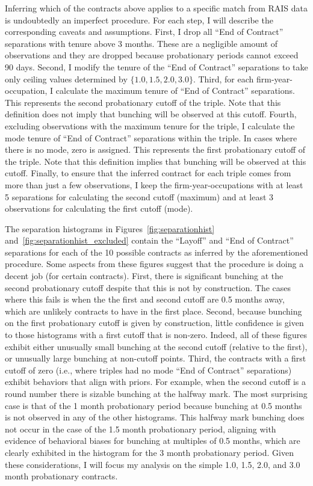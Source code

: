 \documentclass[12pt]{article}
\begin{document}
Inferring which of the contracts above applies to a specific match from RAIS data is undoubtedly an imperfect procedure.
For each step, I will describe the corresponding caveats and assumptions.
First, I drop all ``End of Contract'' separations with tenure above 3 months.
These are a negligible amount of observations and they are dropped because probationary periods cannot exceed 90 days.
Second, I modify the tenure of the ``End of Contract'' separations to take only ceiling values determined by $\{1.0,1.5,2.0,3.0\}$.
Third, for each firm-year-occupation, I calculate the maximum tenure of ``End of Contract'' separations.
This represents the second probationary cutoff of the triple.
Note that this definition does not imply that bunching will be observed at this cutoff.
Fourth, excluding observations with the maximum tenure for the triple, I calculate the mode tenure of ``End of Contract'' separations within the triple. 
In cases where there is no mode, zero is assigned.
This represents the first probationary cutoff of the triple.
Note that this definition implies that bunching will be observed at this cutoff.
Finally, to ensure that the inferred contract for each triple comes from more than just a few observations, I keep the firm-year-occupations with at least 5 separations for calculating the second cutoff (maximum) and at least 3 observations for calculating the first cutoff (mode).

The separation histograms in Figures~\ref{fig:separationhist} and~\ref{fig:separationhist_excluded} contain the ``Layoff'' and ``End of Contract'' separations for each of the 10 possible contracts as inferred by the aforementioned procedure.
Some aspects from these figures suggest that the procedure is doing a decent job (for certain contracts).
First, there is significant bunching at the second probationary cutoff despite that this is not by construction.
The cases where this fails is when the the first and second cutoff are 0.5 months away, which are unlikely contracts to have in the first place.
Second, because bunching on the first probationary cutoff is given by construction, little confidence is given to those histograms with a first cutoff that is non-zero.
Indeed, all of these figures exhibit either unusually small bunching at the second cutoff (relative to the first), or unusually large bunching at non-cutoff points.
Third, the contracts with a first cutoff of zero (i.e., where triples had no mode ``End of Contract'' separations) exhibit behaviors that align with priors.
For example, when the second cutoff is a round number there is sizable bunching at the halfway mark.
The most surprising case is that of the 1 month probationary period because bunching at 0.5 months is not observed in any of the other histograms.
This halfway mark bunching does not occur in the case of the 1.5 month probationary period, aligning with evidence of behavioral biases for bunching at multiples of 0.5 months, which are clearly exhibited in the histogram for the 3 month probationary period.
Given these considerations, I will focus my analysis on the simple 1.0, 1.5, 2.0, and 3.0 month probationary contracts. 
\end{document}
